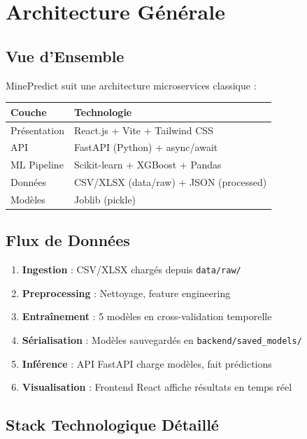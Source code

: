 \documentclass[12pt,a4paper,french]{article}
\begin{document}
\section{Architecture Générale}

\subsection{Vue d'Ensemble}

MinePredict suit une architecture microservices classique :

\begin{center}
\begin{tabular}{|l|l|}
\toprule
\textbf{Couche} & \textbf{Technologie} \\
\midrule
Présentation & React.js + Vite + Tailwind CSS \\
API & FastAPI (Python) + async/await \\
ML Pipeline & Scikit-learn + XGBoost + Pandas \\
Données & CSV/XLSX (data/raw) + JSON (processed) \\
Modèles & Joblib (pickle) \\
\bottomrule
\end{tabular}
\end{center}

\subsection{Flux de Données}

\begin{enumerate}
    \item \textbf{Ingestion} : CSV/XLSX chargés depuis \texttt{data/raw/}
    \item \textbf{Preprocessing} : Nettoyage, feature engineering
    \item \textbf{Entraînement} : 5 modèles en cross-validation temporelle
    \item \textbf{Sérialisation} : Modèles sauvegardés en \texttt{backend/saved\_models/}
    \item \textbf{Inférence} : API FastAPI charge modèles, fait prédictions
    \item \textbf{Visualisation} : Frontend React affiche résultats en temps réel
\end{enumerate}

\subsection{Stack Technologique Détaillé}
\end{document}
